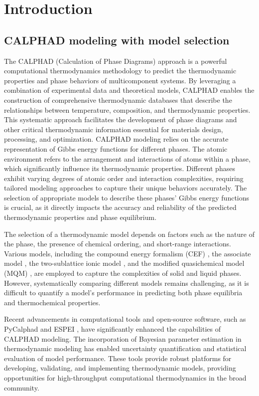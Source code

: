 \chapter{Introduction} \label{sec:Introduction}

\section{CALPHAD modeling with model selection} \label{intro:sec:calphad}
The CALPHAD (Calculation of Phase Diagrams) approach \cite{liu2020computational, lukas2007computational} is a powerful computational thermodynamics methodology to predict the thermodynamic properties and phase behaviors of multicomponent systems. By leveraging a combination of experimental data and theoretical models, CALPHAD enables the construction of comprehensive thermodynamic databases that describe the relationships between temperature, composition, and thermodynamic properties. This systematic approach facilitates the development of phase diagrams and other critical thermodynamic information essential for materials design, processing, and optimization. CALPHAD modeling relies on the accurate representation of Gibbs energy functions for different phases. The atomic environment refers to the arrangement and interactions of atoms within a phase, which significantly influence its thermodynamic properties. Different phases exhibit varying degrees of atomic order and interaction complexities, requiring tailored modeling approaches to capture their unique behaviors accurately. The selection of appropriate models to describe these phases' Gibbs energy functions is crucial, as it directly impacts the accuracy and reliability of the predicted thermodynamic properties and phase equilibrium. 

The selection of a thermodynamic model depends on factors such as the nature of the phase, the presence of chemical ordering, and short-range interactions. Various models, including the compound energy formalism (CEF) \cite{hillert1970regular}, the associate model \cite{sommer1982association}, the two-sublattice ionic model \cite{hillert1985two}, and the modified quasichemical model (MQM) \cite{pelton2018phase}, are employed to capture the complexities of solid and liquid phases. However, systematically comparing different models remains challenging, as it is difficult to quantify a model's performance in predicting both phase equilibria and thermochemical properties.

Recent advancements in computational tools and open-source software, such as PyCalphad \cite{otis2017pycalphad} and ESPEI \cite{bocklund2019espei}, have significantly enhanced the capabilities of CALPHAD modeling. The incorporation of Bayesian parameter estimation in thermodynamic modeling has enabled uncertainty quantification and statistical evaluation of model performance. These tools provide robust platforms for developing, validating, and implementing thermodynamic models, providing opportunities for high-throughput computational thermodynamics in the broad community.

